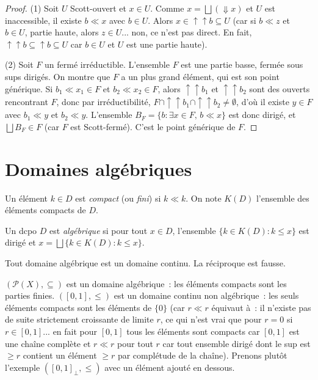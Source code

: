 \begin{proof}
(1) Soit $U$ Scott-ouvert et $x \in U$. Comme $x = \bigsqcup(\Downarrow x)$ et $U$ est
inaccessible, il existe $b \ll x$ avec $b \in U$. Alors
$x \in \uparrow\!\! \uparrow b \subseteq U$ (car si $b \ll z$ et $b \in U$, partie haute,
alors $z \in U$... non, ce n'est pas direct. En fait, $\uparrow\!\! \uparrow b \subseteq
\uparrow b \subseteq U$ car $b \in U$ et $U$ est une partie haute).

(2) Soit $F$ un ferm\'e irr\'eductible. L'ensemble $F$ est une partie basse, ferm\'ee sous
sups dirig\'es. On montre que $F$ a un plus grand \'el\'ement, qui est son point g\'en\'erique.
Si $b_1 \ll x_1 \in F$ et $b_2 \ll x_2 \in F$, alors $\uparrow\!\! \uparrow b_1$ et
$\uparrow\!\! \uparrow b_2$ sont des ouverts rencontrant $F$, donc par irr\'eductibilit\'e,
$F \cap \uparrow\!\! \uparrow b_1 \cap \uparrow\!\! \uparrow b_2 \neq \emptyset$, d'o\`u
il existe $y \in F$ avec $b_1 \ll y$ et $b_2 \ll y$. L'ensemble
$B_F = \{b : \exists x \in F,\, b \ll x\}$ est donc dirig\'e, et $\bigsqcup B_F \in F$
(car $F$ est Scott-ferm\'e). C'est le point g\'en\'erique de $F$.
\end{proof}

\section{Domaines alg\'ebriques}

\begin{definition}
Un \'el\'ement $k \in D$ est \emph{compact} (ou \emph{fini}) si $k \ll k$.
On note $K(D)$ l'ensemble des \'el\'ements compacts de $D$.
\end{definition}

\begin{definition}
Un dcpo $D$ est \emph{alg\'ebrique} si pour tout $x \in D$, l'ensemble
$\{k \in K(D) : k \leq x\}$ est dirig\'e et $x = \bigsqcup\{k \in K(D) : k \leq x\}$.
\end{definition}

\begin{proposition}
Tout domaine alg\'ebrique est un domaine continu. La r\'eciproque est fausse.
\end{proposition}

\begin{exemple}
$(\mathcal{P}(X), \subseteq)$ est un domaine alg\'ebrique~: les \'el\'ements compacts sont
les parties finies. $([0,1], \leq)$ est un domaine continu non alg\'ebrique~: les seuls
\'el\'ements compacts sont les \'el\'ements de $\{0\}$ (car $r \ll r$ \'equivaut \`a~: il
n'existe pas de suite strictement croissante de limite $r$, ce qui n'est vrai que pour
$r = 0$ si $r \in [0,1]$... en fait pour $[0,1]$ tous les \'el\'ements sont compacts car
$[0,1]$ est une cha\^ine compl\`ete et $r \ll r$ pour tout $r$ car tout ensemble dirig\'e
dont le sup est $\geq r$ contient un \'el\'ement $\geq r$ par compl\'etude de la cha\^ine).
Prenons plut\^ot l'exemple $([0,1]_\bot, \leq)$ avec un \'el\'ement ajout\'e en dessous.
\end{exemple}

